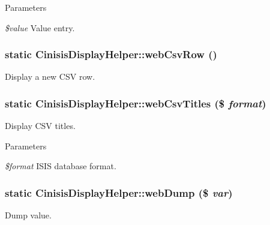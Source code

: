 \begin{DoxyParams}{Parameters}
\item[{\em \$value}]Value entry. \end{DoxyParams}
\hypertarget{classCinisisDisplayHelper_aa020ea03001524e4e437069f08ba8e26}{
\subsubsection[{webCsvRow}]{\setlength{\rightskip}{0pt plus 5cm}static CinisisDisplayHelper::webCsvRow ()}}
\label{classCinisisDisplayHelper_aa020ea03001524e4e437069f08ba8e26}
Display a new CSV row. \hypertarget{classCinisisDisplayHelper_ae15e846c353078222ee061a835c8c0f8}{
\subsubsection[{webCsvTitles}]{\setlength{\rightskip}{0pt plus 5cm}static CinisisDisplayHelper::webCsvTitles (\$ {\em format})}}
\label{classCinisisDisplayHelper_ae15e846c353078222ee061a835c8c0f8}
Display CSV titles.


\begin{DoxyParams}{Parameters}
\item[{\em \$format}]ISIS database format. \end{DoxyParams}
\hypertarget{classCinisisDisplayHelper_a7811830062abc85b90cf391a9ff89fdf}{
\subsubsection[{webDump}]{\setlength{\rightskip}{0pt plus 5cm}static CinisisDisplayHelper::webDump (\$ {\em var})}}
\label{classCinisisDisplayHelper_a7811830062abc85b90cf391a9ff89fdf}
Dump value.


